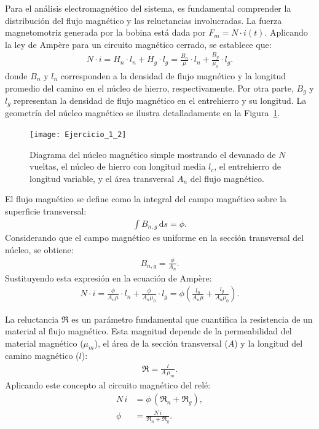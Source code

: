 \documentclass[
  11pt,
  letterpaper,
   addpoints,
   answers
  ]{exam}
\newcommand{\Rel}{\mathfrak{R}} %
\begin{document}
Para el análisis electromagnético del sistema, es fundamental comprender la distribución del flujo magnético y las reluctancias involucradas. La fuerza magnetomotriz generada por la bobina está dada por $F_m = N \cdot i(t)$. Aplicando la ley de Ampère para un circuito magnético cerrado, se establece que:
\begin{align}
  N \cdot i = H_n \cdot l_n + H_g \cdot l_g  = \frac{B_n}{\mu} \cdot l_n + \frac{B_g}{\mu_0} \cdot l_g .
\end{align}
donde $B_n$ y $l_n$ corresponden a la densidad de flujo magnético y la longitud promedio del camino en el núcleo de hierro, respectivamente. Por otra parte, $B_g$ y $l_g$ representan la densidad de flujo magnético en el entrehierro y su longitud. La geometría del núcleo magnético se ilustra detalladamente en la Figura~\ref{fig:core}.

\begin{figure}[h!]
  \centering
  \texttt{[image: Ejercicio\_1\_2]}
  \caption{Diagrama del núcleo magnético simple mostrando el devanado de $N$ vueltas, el núcleo de hierro con longitud media $l_c$, el entrehierro de longitud variable, y el área transversal $A_n$ del flujo magnético.}
  \label{fig:core}
\end{figure}

El flujo magnético se define como la integral del campo magnético sobre la superficie transversal:
\begin{align}
  \int B_{n,g}\, \mathrm{d}s = \phi.
\end{align}
Considerando que el campo magnético es uniforme en la sección transversal del núcleo, se obtiene:
\begin{align}
  B_{n,g} = \frac{\phi}{A_n}.
\end{align}
Sustituyendo esta expresión en la ecuación de Ampère:
\begin{align}
  N \cdot i = \frac{\phi}{A_n \mu} \cdot l_n + \frac{\phi}{A_n \mu_0} \cdot l_g = \phi\!\left(\frac{l_n}{A_n \mu} + \frac{l_g}{A_n \mu_0}\right).
\end{align}

La reluctancia $\Rel$ es un parámetro fundamental que cuantifica la resistencia de un material al flujo magnético. Esta magnitud depende de la permeabilidad del material magnético ($\mu_m$), el área de la sección transversal ($A$) y la longitud del camino magnético ($l$):
\begin{align}
  \Rel = \frac{l}{A\,\mu_m}.
\end{align}
Aplicando este concepto al circuito magnético del relé:
\begin{align}
  N\,i &= \phi\,(\Rel_n + \Rel_g), \\
  \phi &= \frac{N\,i}{\Rel_n + \Rel_g}.
\end{align}
\end{document}
